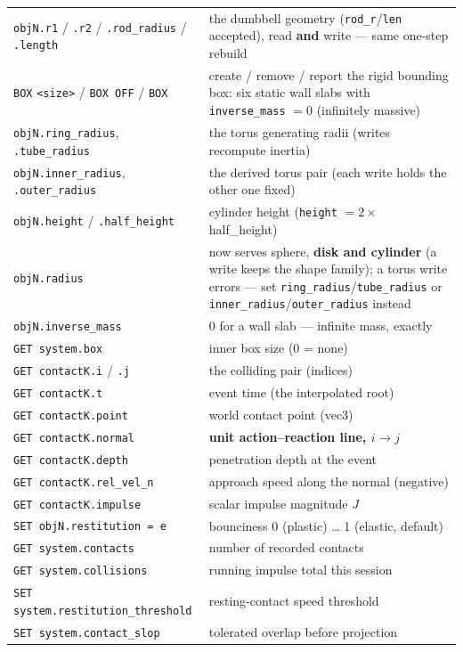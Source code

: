 \documentclass[11pt]{article}
\newcommand{\kw}[1]{\texttt{\uppercase{#1}}}
\newcommand{\code}[1]{\texttt{#1}}
\begin{document}
\begin{center}
\begin{longtable}{p{5.6cm}p{8.6cm}}
\code{objN.r1} / \code{.r2} / \code{.rod\_radius} / \code{.length} & the dumbbell geometry (\code{rod\_r}/\code{len} accepted), read \textbf{and} write --- same one-step rebuild\\
\kw{box} \code{<size>} / \kw{box off} / \kw{box} & create / remove / report the rigid bounding box: six static wall slabs with \code{inverse\_mass} $= 0$ (infinitely massive)\\
\code{objN.ring\_radius}, \code{.tube\_radius} & the torus generating radii (writes recompute inertia)\\
\code{objN.inner\_radius}, \code{.outer\_radius} & the derived torus pair (each write holds the other one fixed)\\
\code{objN.height} / \code{.half\_height} & cylinder height (\code{height} $= 2 \times$ half\_height)\\
\code{objN.radius} & now serves sphere, \textbf{disk and cylinder} (a write keeps the shape family); a torus write errors --- set \code{ring\_radius}/\code{tube\_radius} or \code{inner\_radius}/\code{outer\_radius} instead\\
\code{objN.inverse\_mass} & 0 for a wall slab --- infinite mass, exactly\\
\code{GET system.box} & inner box size (0 = none)\\
\code{GET contactK.i} / \code{.j} & the colliding pair (indices)\\
\code{GET contactK.t} & event time (the interpolated root)\\
\code{GET contactK.point} & world contact point (vec3)\\
\code{GET contactK.normal} & \textbf{unit action--reaction line, $i \to j$}\\
\code{GET contactK.depth} & penetration depth at the event\\
\code{GET contactK.rel\_vel\_n} & approach speed along the normal (negative)\\
\code{GET contactK.impulse} & scalar impulse magnitude $J$\\
\code{SET objN.restitution = e} & bounciness 0 (plastic) \ldots{} 1 (elastic, default)\\
\code{GET system.contacts} & number of recorded contacts\\
\code{GET system.collisions} & running impulse total this session\\
\code{SET system.restitution\_threshold} & resting-contact speed threshold\\
\code{SET system.contact\_slop} & tolerated overlap before projection\\
\end{longtable}
\end{center}
\end{document}
